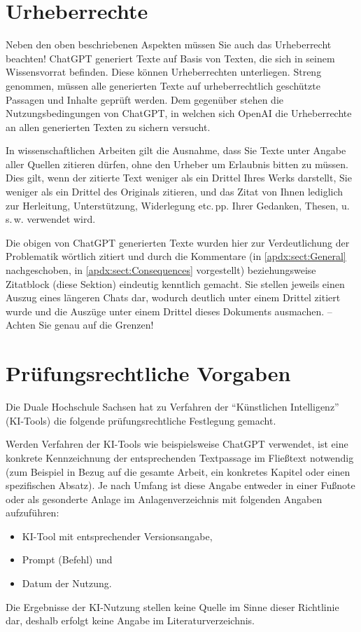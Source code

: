 \section{Urheberrechte}\label{apdx:sect:Copyright}
Neben den oben beschriebenen Aspekten müssen Sie auch das Urheberrecht beachten! Chat\-GPT generiert Texte auf Basis von Texten, die sich in seinem Wissensvorrat befinden. Diese können Urheberrechten unterliegen. Streng genommen, müssen alle generierten Texte auf urheberrechtlich geschützte Passagen und Inhalte geprüft werden. Dem gegenüber stehen die Nutzungsbedingungen von ChatGPT, in welchen sich OpenAI die Urheberrechte an allen generierten Texten zu sichern versucht.

In wissenschaftlichen Arbeiten gilt die Ausnahme, dass Sie Texte unter Angabe aller Quellen zitieren dürfen, ohne den Urheber um Erlaubnis bitten zu müssen. Dies gilt, wenn der zitierte Text weniger als ein Drittel Ihres Werks darstellt, Sie weniger als ein Drittel des Originals zitieren, und das Zitat von Ihnen lediglich zur Herleitung, Unterstützung, Widerlegung etc.\,pp. Ihrer Gedanken, Thesen, u.\,s.\,w. verwendet wird.

Die obigen von ChatGPT generierten Texte wurden hier zur Verdeutlichung der Problematik wörtlich zitiert und durch die Kommentare (in \ref{apdx:sect:General} nachgeschoben, in \ref{apdx:sect:Consequences} vorgestellt) beziehungsweise Zitatblock (diese Sektion) eindeutig kenntlich gemacht. Sie stellen jeweils einen Auszug eines längeren Chats dar, wodurch deutlich unter einem Drittel zitiert wurde und die Auszüge unter einem Drittel dieses Dokuments ausmachen. --\,Achten Sie genau auf die Grenzen!

\section{Prüfungsrechtliche Vorgaben}\label{apdx:sect:Legal}
Die Duale Hochschule Sachsen hat zu Verfahren der \enquote{Künstlichen Intelligenz} (KI-Tools) die folgende prüfungsrechtliche Festlegung gemacht.

Werden Verfahren der KI-Tools wie beispielsweise ChatGPT verwendet, ist eine konkrete Kennzeichnung der entsprechenden Textpassage im Fließtext notwendig (zum Beispiel in Bezug auf die gesamte Arbeit, ein konkretes Kapitel oder einen spezifischen Absatz). Je nach Umfang ist diese Angabe entweder in einer Fußnote oder als gesonderte Anlage im Anlagenverzeichnis mit folgenden Angaben aufzuführen:
\begin{itemize}
    \item KI-Tool mit entsprechender Versionsangabe,
    \item Prompt (Befehl) und
    \item Datum der Nutzung.
\end{itemize}

Die Ergebnisse der KI-Nutzung stellen keine Quelle im Sinne dieser Richtlinie dar, deshalb erfolgt keine Angabe im Literaturverzeichnis.